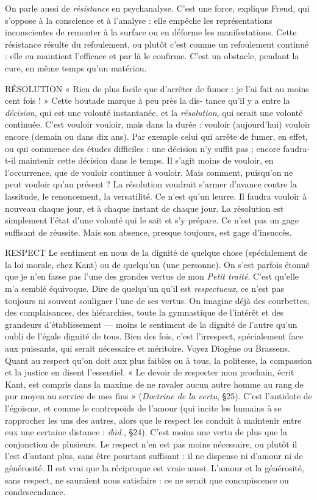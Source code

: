 On parle aussi de {\it résistance} en psychanalyse. C’est une force, explique
Freud, qui s'oppose à la conscience et à l’analyse : elle empêche les représentations
inconscientes de remonter à la surface ou en déforme les manifestations.
Cette résistance résulte du refoulement, ou plutôt c’est comme un refoulement
continué : elle en maintient l’efficace et par là le confirme. C’est un obstacle,
pendant la cure, en même temps qu’un matériau.

RÉSOLUTION « Rien de plus facile que d’arrêter de fumer : je l’ai fait au
moins cent fois ! » Cette boutade marque à peu près la dis-
tance qu’il y a entre la {\it décision}, qui est une volonté instantanée, et la {\it résolution},
qui serait une volonté continuée. C’est vouloir vouloir, mais dans la durée :
vouloir (aujourd’hui) vouloir encore (demain ou dans dix ans). Par exemple
celui qui arrête de fumer, en effet, ou qui commence des études difficiles : une
décision n’y suffit pas ; encore faudra-t-il maintenir cette décision dans le
temps. Il s’agit moins de vouloir, en l’occurrence, que de vouloir continuer à
vouloir. Mais comment, puisqu'on ne peut vouloir qu’au présent ? La résolution
voudrait s’armer d’avance contre la lassitude, le renoncement, la versatilité.
Ce n’est qu’un leurre. Il faudra vouloir à nouveau chaque jour, et à chaque instant
de chaque jour. La résolution est simplement l’état d’une volonté qui le
sait et s’y prépare. Ce n’est pas un gage suffisant de réussite. Mais son absence,
presque toujours, est gage d’insuccès.

RESPECT Le sentiment en nous de la dignité de quelque chose (spécialement
de la loi morale, chez Kant) ou de quelqu'un (une personne).
On s’est parfois étonné que je n’en fasse pas l’une des grandes vertus de
mon {\it Petit traité}. C’est qu’elle m’a semblé équivoque. Dire de quelqu'un qu’il
est {\it respectueux}, ce n’est pas toujours ni souvent souligner l’une de ses vertus.
On imagine déjà des courbettes, des complaisances, des hiérarchies, toute la
gymnastique de l’intérêt et des grandeurs d’établissement — moins le sentiment
de la dignité de l’autre qu’un oubli de l’égale dignité de tous. Bien des fois, c’est
l’irrespect, spécialement face aux puissants, qui serait nécessaire et méritoire.
Voyez Diogène ou Brassens. Quant au respect qu’on doit aux plus faibles ou à
tous, la politesse, la compassion et la justice en disent l’essentiel. « Le devoir de
respecter mon prochain, écrit Kant, est compris dans la maxime de ne ravaler
aucun autre homme au rang de pur moyen au service de mes fins » ({\it Doctrine de
la vertu}, \S 25). C’est l'antidote de l’égoïsme, et comme le contrepoids de
l'amour (qui incite les humains à se rapprocher les uns des autres, alors que le
respect les conduit à maintenir entre eux une certaine distance : {\it ibid.}, \S 24).
C’est moins une vertu de plus que la conjonction de plusieurs. Le respect n’en
est pas moins nécessaire, ou plutôt il l’est d’autant plus, sans être pourtant
suffisant : il ne dispense ni d’amour ni de générosité. Il est vrai que la réciproque
est vraie aussi. L'amour et la générosité, sans respect, ne sauraient nous
satisfaire : ce ne serait que concupiscence ou condescendance.

